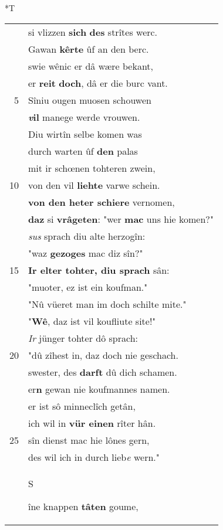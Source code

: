 \documentclass[8pt,a4paper,notitlepage]{article}
\begin{document}
\begin{table}[ht]
\begin{minipage}[t]{0.5\linewidth}
\small
\begin{center}*T
\end{center}
\begin{tabular}{rl}
 & si vlizzen \textbf{sich} \textbf{des} strîtes werc.\\ 
 & Gawan \textbf{kêrte} ûf an den berc.\\ 
 & swie wênic er dâ wære bekant,\\ 
 & er \textbf{reit} \textbf{doch}, dâ er die burc vant.\\ 
5 & Sîniu ougen muosen schouwen\\ 
 & \textbf{\textit{v}il} manege werde vrouwen.\\ 
 & Diu wirtîn selbe komen was\\ 
 & durch warten ûf \textbf{den} palas\\ 
 & mit ir schœnen tohteren zwein,\\ 
10 & von den vil \textbf{liehte} varwe schein.\\ 
 & \textbf{von den heter schiere} vernomen,\\ 
 & \textbf{daz} si \textbf{vrâgeten}: "wer \textbf{mac} uns hie komen?"\\ 
 & \textit{sus} sprach diu alte herzogîn:\\ 
 & "waz \textbf{gezoges} mac diz sîn?"\\ 
15 & \textbf{Ir elter tohter, diu sprach} sân:\\ 
 & "muoter, ez ist ein koufman."\\ 
 & "Nû vüeret man im doch schilte mite."\\ 
 & "\textbf{Wê}, daz ist vil koufliute site!"\\ 
 & \textit{Ir} jünger tohter dô sprach:\\ 
20 & "dû zîhest in, daz doch nie geschach.\\ 
 & swester, des \textbf{darft} dû dich schamen.\\ 
 & er\textbf{n} gewan nie koufmannes namen.\\ 
 & er ist sô minneclîch getân,\\ 
 & ich wil in \textbf{vür einen} rîter hân.\\ 
25 & sîn dienst mac hie lônes gern,\\ 
 & des wil ich in durch lieb\textit{e} wern."\\ 
 & \begin{large}S\end{large}îne knappen \textbf{tâten} goume,\\ 

\end{tabular}
\end{minipage}
\end{table}
\end{document}
